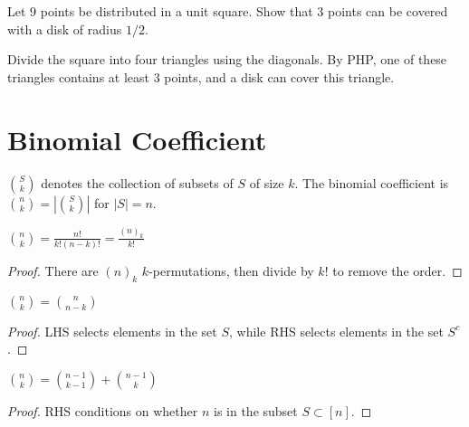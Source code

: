 \documentclass[a4paper]{article}
\begin{document}
\begin{example}
Let 9 points be distributed in a unit square. Show that 3 points can be covered with a disk of radius $1/2$.

\begin{hl}
Divide the square into four triangles using the diagonals. By PHP, one of these triangles contains at least 3 points, and a disk can cover this triangle.
\end{hl}
\end{example}

\section{Binomial Coefficient}

\begin{definition}
$\binom Sk$ denotes the collection of subsets of $S$ of size $k$. The binomial coefficient is $\binom nk=\left|\binom Sk\right|$ for $|S|=n$.
\end{definition}

\begin{theorem}
$\displaystyle \binom nk=\frac{n!}{k!(n-k)!}=\frac{(n)_k}{k!}$

\begin{hl}
\begin{proof}
There are $(n)_k$ $k$-permutations, then divide by $k!$ to remove the order.
\end{proof}
\end{hl}
\end{theorem}

\begin{theorem}
$\displaystyle \binom nk=\binom n{n-k}$

\begin{hl}
\begin{proof}
LHS selects elements in the set $S$, while RHS selects elements in the set $S^c$.
\end{proof}
\end{hl}
\end{theorem}

\begin{theorem}
$\displaystyle \binom nk=\binom{n-1}{k-1}+\binom{n-1}k$

\begin{hl}
\begin{proof}
RHS conditions on whether $n$ is in the subset $S\subset [n]$.
\end{proof}
\end{hl}
\end{theorem}
\end{document}
